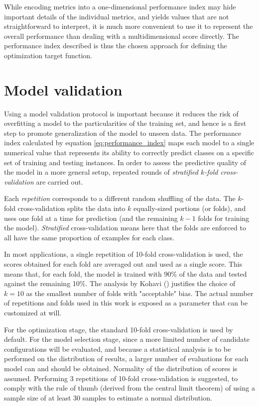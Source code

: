 	While encoding metrics into a one-dimensional performance index may hide important details of
	the individual metrics, and yields values that are not straightforward to interpret, it is much
	more convenient to use it to represent the overall performance than dealing with a
	multidimensional score directly. The performance index described is thus the chosen approach for
	defining the optimization target function.

\section{Model validation}
Using a model validation protocol is important because it reduces the risk of overfitting a model to
the particularities of the training set, and hence is a first step to promote generalization of the
model to unseen data.
The performance index calculated by equation \ref{eq:performance_index} maps each model to a single
numerical value that represents its ability to correctly predict classes on a specific set of training
and testing instances. In order to assess the predictive quality of the model in a more general
setup, repeated rounds of \emph{stratified $k$-fold cross-validation} are carried out. 

Each \emph{repetition} corresponds to a different random shuffling of the data. The $k$-fold
cross-validation splits the data into $k$ equally-sized portions (or folds), and uses one fold at a
time for prediction (and the remaining $k-1$ folds for training the model). \emph{Stratified} cross-validation
means here that the folds are enforced to all have the same proportion of examples for each class.

In most applications, a single repetition of 10-fold cross-validation is used, the scores obtained
for each fold are averaged out and used as a single score. This means that, for each fold,
the model is trained with 90\% of the data and tested against the remaining 10\%.
The analysis by Kohavi (\cite{kohavi1995cv}) justifies the choice of $k=10$ as the smallest number of folds with "acceptable"
bias. The actual number of repetitions and folds used in this work is exposed as a parameter that
can be customized at will.

For the optimization stage, the standard 10-fold cross-validation is used by default. For the model
selection stage, since a more limited number of candidate configurations will be evaluated, and
because a statistical analysis is to be performed on the distribution of results, a larger number of
evaluations for each model can and should be obtained. Normality of the distribution of scores is assumed.
Performing 3 repetitions of 10-fold cross-validation is suggested, to comply with the rule of thumb
(derived from the central limit theorem)
of using a sample size of at least 30 samples to estimate a normal distribution.

